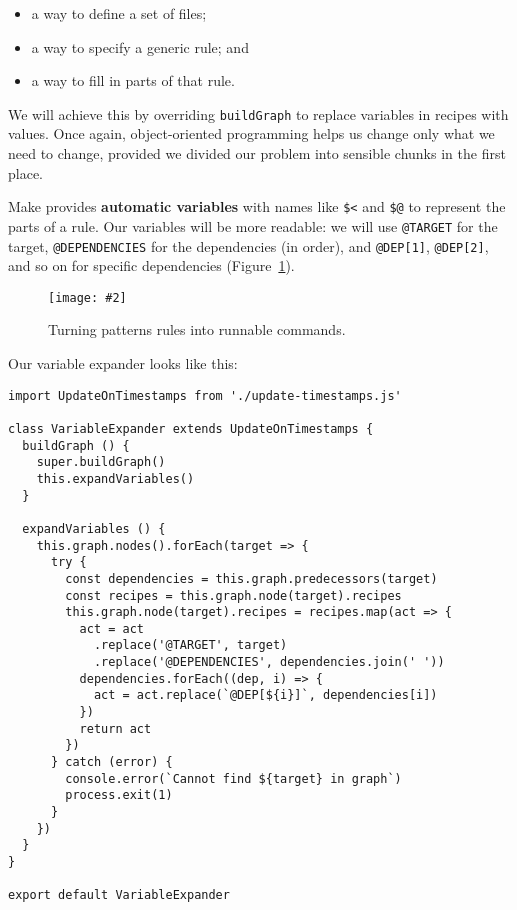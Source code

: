 \documentclass[krantzl]{krantz}
\newcommand{\figpdf}[4]{\begin{figure}%
\centering%
\texttt{[image: \#2]}%
\caption{#3}%
\label{#1}%
\end{figure}}
\newcommand{\figref}[1]{Figure~\ref{#1}}
\newcommand{\glossref}[1]{\textbf{#1}}
\begin{document}
\begin{itemize}

\item 

a way to define a set of files;



\item 

a way to specify a generic rule;
    and



\item 

a way to fill in parts of that rule.



\end{itemize}


We will achieve this by overriding \texttt{buildGraph} to replace variables in recipes with values.
Once again,
object-oriented programming helps us change only what we need to change,
provided we divided our problem into sensible chunks in the first place.


Make provides \glossref{automatic variables}
with names like \texttt{\$<} and \texttt{\$@}
to represent the parts of a rule.
Our variables will be more readable:
we will use \texttt{@TARGET} for the target,
\texttt{@DEPENDENCIES} for the dependencies (in order),
and \texttt{@DEP[1]}, \texttt{@DEP[2]}, and so on for specific dependencies
(\figref{build-manager-pattern-rules}).

\figpdf{build-manager-pattern-rules}{./build-manager/pattern-rules.pdf}{Turning patterns rules into runnable commands.}{0.6}


Our variable expander looks like this:


\begin{lstlisting}[frame=single,frameround=tttt]
import UpdateOnTimestamps from './update-timestamps.js'

class VariableExpander extends UpdateOnTimestamps {
  buildGraph () {
    super.buildGraph()
    this.expandVariables()
  }

  expandVariables () {
    this.graph.nodes().forEach(target => {
      try {
        const dependencies = this.graph.predecessors(target)
        const recipes = this.graph.node(target).recipes
        this.graph.node(target).recipes = recipes.map(act => {
          act = act
            .replace('@TARGET', target)
            .replace('@DEPENDENCIES', dependencies.join(' '))
          dependencies.forEach((dep, i) => {
            act = act.replace(`@DEP[${i}]`, dependencies[i])
          })
          return act
        })
      } catch (error) {
        console.error(`Cannot find ${target} in graph`)
        process.exit(1)
      }
    })
  }
}

export default VariableExpander
\end{lstlisting}
\end{document}
